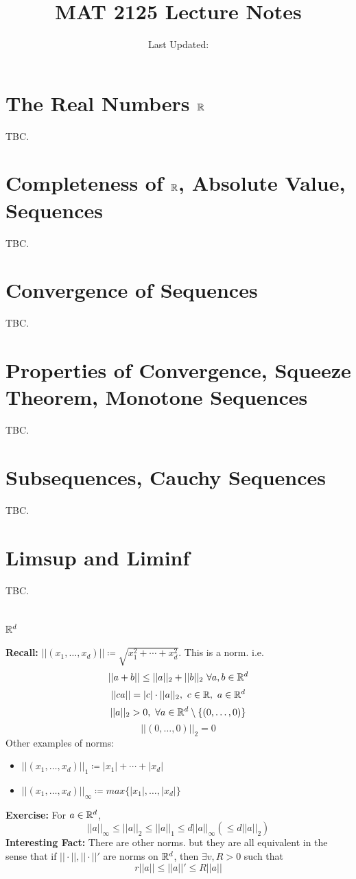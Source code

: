 \documentclass[openany]{report}
\title{MAT 2125 Lecture Notes}
\author{Last Updated:}
\begin{document}
\maketitle

\tableofcontents

\chapter{The Real Numbers $\mathbb{R}$}
TBC.
\chapter{Completeness of $\mathbb{R}$, Absolute Value, Sequences }
TBC.
\chapter{Convergence of Sequences}
TBC. 
\chapter{Properties of Convergence, Squeeze Theorem, Monotone Sequences}
TBC. 
\chapter{Subsequences, Cauchy Sequences}
TBC.
\chapter{Limsup and Liminf}
TBC.
\chapter{}
\chapter{}
\chapter{$\mathbb{R}^d$}
\textbf{Recall:} $||(x_1, \dots, x_d)|| \coloneqq \sqrt{x_1^2 + \cdots + x_d^2}$. This is a norm. i.e. 
$$||a + b|| \leq ||a||_2 + ||b||_2 \ \forall a,b \in \mathbb{R}^d$$ 
$$||ca|| = |c|\cdot ||a||_2, \ c \in \mathbb{R}, \ a \in \mathbb{R}^d$$ 
$$||a||_2 > 0, \ \forall a \in \mathbb{R}^d \setminus \{(0,\dots,0)\}$$
$$||(0,\dots, 0)||_2 = 0$$
Other examples of norms: 
\begin{itemize}
    \item $||(x_1, \dots, x_d)||_1 \coloneqq |x_1| + \cdots + |x_d|$
    \item  $||(x_1, \dots, x_d)||_\infty \coloneqq max\{|x_1|, \dots, |x_d|\}$
\end{itemize}
\textbf{Exercise:} For $a \in \mathbb{R}^d$, $$||a||_\infty \leq ||a||_2 \leq ||a||_1 \leq d||a||_\infty (\leq d||a||_2)$$
\textbf{Interesting Fact:} There are other norms. but they are all equivalent in the sense that if $||\cdot||, ||\cdot||'$ are norms on $\mathbb{R}^d$, then $\exists v, R > 0$ such that
$$r||a|| \leq ||a||' \leq R||a||$$
\end{document}

